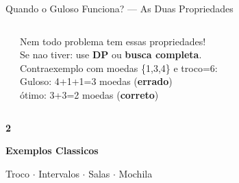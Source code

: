 \documentclass[aspectratio=169,10pt]{beamer}
\begin{document}
\begin{frame}{Quando o Guloso Funciona? --- As Duas Propriedades}
\begin{columns}[t]
\begin{tcolorbox}[caixaVerde,title={Como provar intuitivamente?}]
      \end{tcolorbox}
      \vspace{0.1cm}
      \begin{tcolorbox}[caixaVermelho,title={Atenção}]
        \footnotesize
        Nem todo problema tem essas propriedades!\\[3pt]
        Se nao tiver: use \textbf{DP} ou \textbf{busca completa}.\\[3pt]
        Contraexemplo com moedas \{1,3,4\} e troco=6:\\
        Guloso: 4+1+1=3 moedas \textcolor{gemaRed}{(\textbf{errado})}\\
        ótimo: 3+3=2 moedas \textcolor{gemaGreen}{(\textbf{correto})}
      \end{tcolorbox}
  \end{columns}
\end{frame}

{
\begin{frame}[noframenumbering]
  \centering\vspace{1.0cm}
  {\fontsize{36}{44}\selectfont\bfseries\color{gemaBlue} 2}\par
  \vspace{0.25cm}
  {\Large\color{greedyGold}\bfseries Exemplos Classicos}\par
  \vspace{0.15cm}
  {\color{gray}\small Troco $\cdot$ Intervalos $\cdot$ Salas $\cdot$ Mochila}
\end{frame}
}
\end{document}
